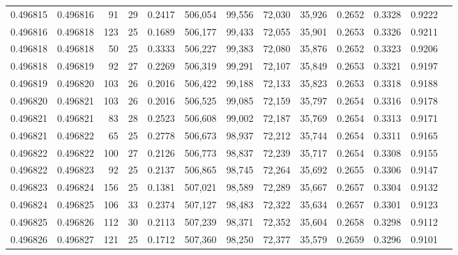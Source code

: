 \begin{tabular}{rrrrrrrrrrrrr}
0.496815 & 0.496816 &  91 &  29 &                                     0.2417 & 506,054 &  99,556 &  72,030 &  35,926 & 0.2652 & 0.3328 & 0.9222 \\
0.496816 & 0.496818 & 123 &  25 &                                     0.1689 & 506,177 &  99,433 &  72,055 &  35,901 & 0.2653 & 0.3326 & 0.9211 \\
0.496818 & 0.496818 &  50 &  25 &                                     0.3333 & 506,227 &  99,383 &  72,080 &  35,876 & 0.2652 & 0.3323 & 0.9206 \\
0.496818 & 0.496819 &  92 &  27 &                                     0.2269 & 506,319 &  99,291 &  72,107 &  35,849 & 0.2653 & 0.3321 & 0.9197 \\
0.496819 & 0.496820 & 103 &  26 &                                     0.2016 & 506,422 &  99,188 &  72,133 &  35,823 & 0.2653 & 0.3318 & 0.9188 \\
0.496820 & 0.496821 & 103 &  26 &                                     0.2016 & 506,525 &  99,085 &  72,159 &  35,797 & 0.2654 & 0.3316 & 0.9178 \\
0.496821 & 0.496821 &  83 &  28 &                                     0.2523 & 506,608 &  99,002 &  72,187 &  35,769 & 0.2654 & 0.3313 & 0.9171 \\
0.496821 & 0.496822 &  65 &  25 &                                     0.2778 & 506,673 &  98,937 &  72,212 &  35,744 & 0.2654 & 0.3311 & 0.9165 \\
0.496822 & 0.496822 & 100 &  27 &                                     0.2126 & 506,773 &  98,837 &  72,239 &  35,717 & 0.2654 & 0.3308 & 0.9155 \\
0.496822 & 0.496823 &  92 &  25 &                                     0.2137 & 506,865 &  98,745 &  72,264 &  35,692 & 0.2655 & 0.3306 & 0.9147 \\
0.496823 & 0.496824 & 156 &  25 &                                     0.1381 & 507,021 &  98,589 &  72,289 &  35,667 & 0.2657 & 0.3304 & 0.9132 \\
0.496824 & 0.496825 & 106 &  33 &                                     0.2374 & 507,127 &  98,483 &  72,322 &  35,634 & 0.2657 & 0.3301 & 0.9123 \\
0.496825 & 0.496826 & 112 &  30 &                                     0.2113 & 507,239 &  98,371 &  72,352 &  35,604 & 0.2658 & 0.3298 & 0.9112 \\
0.496826 & 0.496827 & 121 &  25 &                                     0.1712 & 507,360 &  98,250 &  72,377 &  35,579 & 0.2659 & 0.3296 & 0.9101 \\

\end{tabular}
